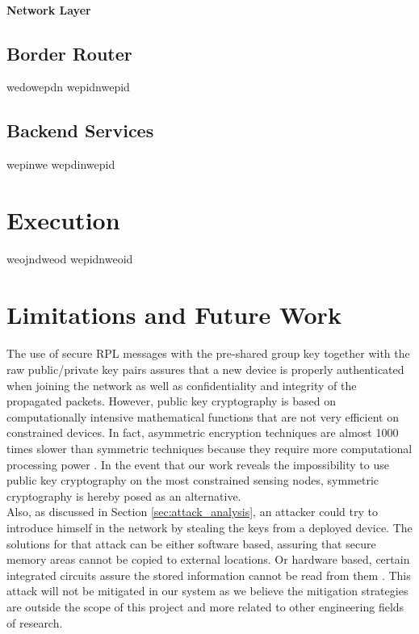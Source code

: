\paragraph{\textbf{Network Layer}}
\paragraph{}



\subsection{Border Router}


wedowepdn
wepidnwepid

\subsection{Backend Services}


wepinwe
wepdinwepid
\section{Execution}

weojndweod
wepidnweoid

\section{Limitations and Future Work}
\paragraph{}
The use of secure RPL messages with the pre-shared group key together with the raw public/private key pairs assures that a new device is properly authenticated when joining the network as well as confidentiality and integrity of the propagated packets. However, public key cryptography is based on computationally intensive mathematical functions that are not very efficient on constrained devices. In fact, asymmetric encryption techniques are almost 1000 times slower than symmetric techniques because they require more computational processing power \cite{Kumar2011}. In the event that our work reveals the impossibility to use public key cryptography on the most constrained sensing nodes, symmetric cryptography is hereby posed as an alternative.\\
Also, as discussed in Section \ref{sec:attack_analysis}, an attacker could try to introduce himself in the network by stealing the keys from a deployed device. The solutions for that attack can be either software based, assuring that secure memory areas cannot be copied to external locations. Or hardware based, certain integrated circuits assure the stored information cannot be read from them \cite{Lesjak2014}. This attack will not be mitigated in our system as we believe the mitigation strategies are outside the scope of this project and more related to other engineering fields of research.\\